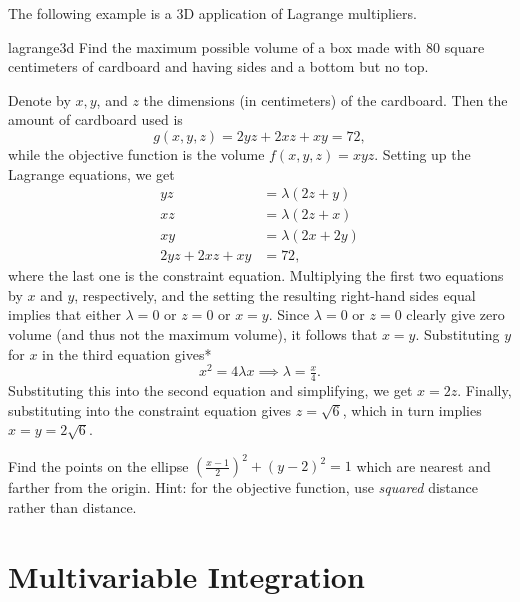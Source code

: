 \documentclass[svgnames]{report}
\begin{document}
  The following example is a 3D application of Lagrange multipliers. 
  
  \begin{example}{}{lagrange3d}
    Find the maximum possible volume of a box made with 80 square
    centimeters of cardboard and having sides and a bottom but no
    top. 
  \end{example}

  \begin{solution}
    Denote by $x,y$, and $z$ the dimensions (in centimeters) of the
    cardboard. Then the amount of cardboard used is
    \[
      g(x,y,z) = 2yz + 2xz + xy = 72, 
    \]
    while the objective function is the volume $f(x,y,z) =
    xyz$. Setting up the Lagrange equations, we get
    \begin{align*}
      yz &= \lambda(2z + y) \\
      xz &= \lambda(2z + x) \\
      xy &= \lambda(2x + 2y) \\
      2yz + 2xz + xy &= 72, 
    \end{align*}
    where the last one is the constraint equation. Multiplying the
    first two equations by $x$ and $y$, respectively, and the setting
    the resulting right-hand sides equal implies that either $\lambda
    = 0$ or $z= 0$ or  $x = y$. Since $\lambda = 0$ or $z = 0$ clearly
    give zero volume (and thus not the maximum volume), it follows
    that $x=y$. Substituting $y$ for $x$ in the third equation gives*
    \[
      x^2 = 4 \lambda x \implies \lambda = \tfrac{x}{4}. 
    \]
    Substituting this into the second equation and simplifying, we get
    $x = 2z$. Finally, substituting into the constraint equation gives
    $z = \sqrt{6}$, which in turn implies $x = y = 2\sqrt{6}$. 
  \end{solution}

  \begin{exercise}{}{}
    Find the points on the ellipse $\left(\frac{x - 1}{2}\right)^2 +
    (y-2)^2 = 1$ which are nearest and farther from the origin. Hint:
    for the objective function, use \textit{squared} distance rather
    than distance. 
  \end{exercise}
  
  \chapter{Multivariable Integration}
\end{document}
